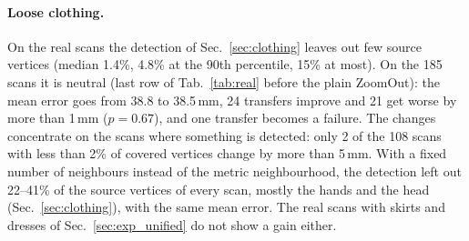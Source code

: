\documentclass[11pt]{article}
\begin{document}
\paragraph{Loose clothing.} On the real scans the detection of
Sec.~\ref{sec:clothing} leaves out few source vertices (median 1.4\%, 4.8\%
at the 90th percentile, 15\% at most). On the
185 scans it is neutral (last row of Tab.~\ref{tab:real} before the plain
ZoomOut): the mean error goes from 38.8 to 38.5\,mm, 24 transfers improve and
21 get worse by more than 1\,mm ($p = 0.67$), and one transfer becomes a
failure. The changes concentrate on the scans where something is detected:
only 2 of the 108 scans with less than 2\% of covered vertices change by more
than 5\,mm. With a fixed number of neighbours instead of the metric
neighbourhood, the detection left out 22--41\% of the source vertices of
every scan, mostly the hands and the head (Sec.~\ref{sec:clothing}), with the
same mean error. The real scans with skirts and dresses of
Sec.~\ref{sec:exp_unified} do not show a gain either.
\end{document}
